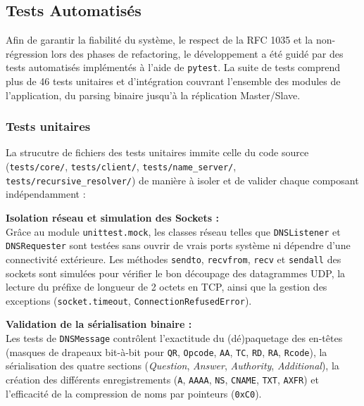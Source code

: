 \subsection{Tests Automatisés}
Afin de garantir la fiabilité du système, le respect de la RFC 1035 et la non-régression lors des phases de refactoring, le développement a été guidé par des tests automatisés implémentés à l'aide de \texttt{pytest}.
La suite de tests comprend plus de 46 tests unitaires et d'intégration couvrant l'ensemble des modules de l'application, du parsing binaire jusqu'à la réplication Master/Slave.

\subsubsection{Tests unitaires}
La strucutre de fichiers des tests unitaires immite celle du code source \\(\texttt{tests/core/}, \texttt{tests/client/}, \texttt{tests/name\_server/}, \texttt{tests/recursive\_resolver/}) de manière à isoler et de valider chaque composant indépendamment :

\textbf{Isolation réseau et simulation des Sockets :}\\
Grâce au module \texttt{unittest.mock}, les classes réseau telles que \texttt{DNSListener} et \texttt{DNSRequester} sont testées sans ouvrir de vrais ports système ni dépendre d'une connectivité extérieure. Les méthodes \texttt{sendto}, \texttt{recvfrom}, \texttt{recv} et \texttt{sendall} des sockets sont simulées pour vérifier le bon découpage des datagrammes UDP, la lecture du préfixe de longueur de 2 octets en TCP, ainsi que la gestion des exceptions (\texttt{socket.timeout}, \texttt{ConnectionRefusedError}).

\textbf{Validation de la sérialisation binaire :}\\
Les tests de \texttt{DNSMessage} contrôlent l'exactitude du (dé)paquetage des en-têtes (masques de drapeaux bit-à-bit pour \texttt{QR}, \texttt{Opcode}, \texttt{AA}, \texttt{TC}, \texttt{RD}, \texttt{RA}, \texttt{Rcode}), la sérialisation des quatre sections (\textit{Question}, \textit{Answer}, \textit{Authority}, \textit{Additional}), la création des différents enregistrements (\texttt{A}, \texttt{AAAA}, \texttt{NS}, \texttt{CNAME}, \texttt{TXT}, \texttt{AXFR}) et l'efficacité de la compression de noms par pointeurs (\texttt{0xC0}).

